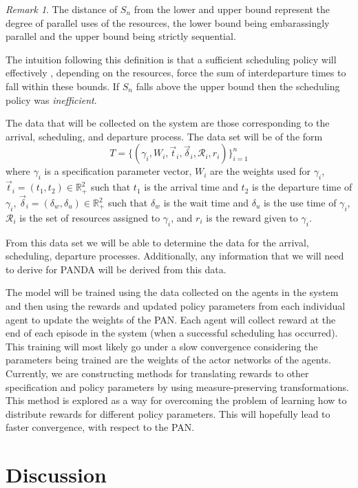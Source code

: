 \documentclass{article}
\theoremstyle{definition}
\theoremstyle{remark}
\newtheorem*{remark}{Remark}
\begin{document}
		\begin{remark}
			The distance of $S_{n}$ from the lower and upper bound represent the degree of parallel uses of the resources, the lower bound being embarassingly parallel and the upper bound being strictly sequential.
		\end{remark}
		The intuition following this definition is that a sufficient scheduling policy will effectively , depending on the resources, force the sum of interdeparture times to fall within these bounds. If $S_{n}$ falls above the upper bound then the scheduling policy was \emph{inefficient}.
	
		The data that will be collected on the system are those corresponding to the arrival, scheduling, and departure process. The data set will be of the form
		\[
		T = \{(\gamma_{i}, W_{i},\vec{t}_{i}, \vec{\delta}_{i}, \mathcal{R}_{i}, r_{i})\}_{i = 1}^{n} 
		\]
		where $\gamma_{i}$ is a specification parameter vector, $W_{i}$ are the weights used for $\gamma_{i}$, $\vec{t}_{i} = (t_{1}, t_{2}) \in \mathbb{R}_{+}^{2}$ such that $t_{1}$ is the arrival time and $t_{2}$ is the departure time of $\gamma_{i}$, $\vec{\delta}_{i} = (\delta_{w}, \delta_{u}) \in \mathbb{R}_{+}^{2}$ such that $\delta_{w}$ is the wait time and $\delta_{u}$ is the use time of $\gamma_{i}$, $\mathcal{R}_{i}$ is the set of resources assigned to $\gamma_{i}$, and $r_{i}$ is the reward given to $\gamma_{i}$. 
		
		From this data set we will be able to determine the data for the arrival, scheduling, departure processes. Additionally, any information that we will need to derive for PANDA will be derived from this data. 
		
		The model will be trained using the data collected on the agents in the system and then using the rewards and updated policy parameters from each individual agent to update the weights of the PAN. Each agent will collect reward at the end of each episode in the system (when a successful scheduling has occurred). This training will most likely go under a slow convergence considering the parameters being trained are the weights of the actor networks of the agents. Currently, we are constructing methods for translating rewards to other specification and policy parameters by using measure-preserving transformations. This method is explored as a way for overcoming the problem of learning how to distribute rewards for different policy parameters. This will hopefully lead to faster convergence, with respect to the PAN.

	\section{Discussion}
	
\end{document}
